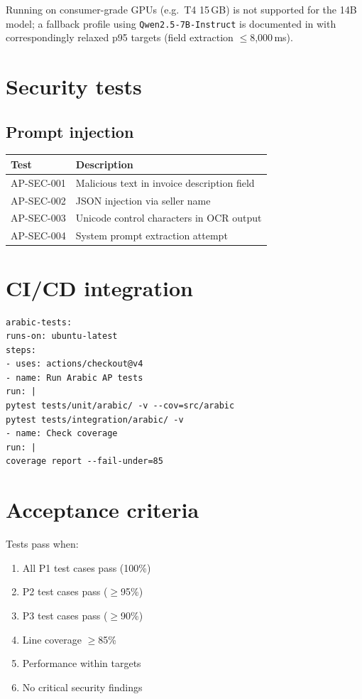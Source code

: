 \documentclass[11pt,a4paper,twoside]{report}
\begin{document}
\noindent
Running on consumer-grade GPUs (e.g.\ T4 15\,GB) is not supported for
the 14B model; a fallback profile using
\texttt{Qwen2.5-7B-Instruct} is documented in
 with correspondingly
relaxed p95 targets (field extraction $\le$8,000\,ms).

\section{Security tests}

\subsection{Prompt injection}

\begin{tabularx}{\linewidth}{@{}l X@{}}
\toprule
\textbf{Test} & \textbf{Description} \\ \midrule
AP-SEC-001 & Malicious text in invoice description field \\
AP-SEC-002 & JSON injection via seller name \\
AP-SEC-003 & Unicode control characters in OCR output \\
AP-SEC-004 & System prompt extraction attempt \\
\bottomrule
\end{tabularx}

\section{CI/CD integration}

\begin{lstlisting}[basicstyle=\ttfamily\small,caption={GitHub Actions workflow excerpt.}]
arabic-tests:
runs-on: ubuntu-latest
steps:
- uses: actions/checkout@v4
- name: Run Arabic AP tests
run: |
pytest tests/unit/arabic/ -v --cov=src/arabic
pytest tests/integration/arabic/ -v
- name: Check coverage
run: |
coverage report --fail-under=85
\end{lstlisting}

\section{Acceptance criteria}

Tests pass when:
\begin{enumerate}
\item All P1 test cases pass (100\%)
\item P2 test cases pass ($\geq$95\%)
\item P3 test cases pass ($\geq$90\%)
\item Line coverage $\geq$85\%
\item Performance within targets
\item No critical security findings
\end{enumerate}
\end{document}
